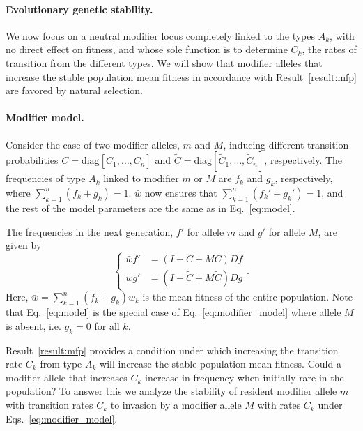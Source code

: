 \documentclass[9pt, a4paper, twocolumn]{extarticle}
\newcommand{\matrx}[1]{{\left[ \stackrel{}{#1}\right]}}
\newcommand{\diag}[1]{\mbox{diag}\matrx{#1}}
\begin{document}
\paragraph*{Evolutionary genetic stability.}

We now focus on a neutral modifier locus completely linked to the types $A_k$, with no direct effect on fitness, and whose sole function is to determine $C_k$, the rates of transition from the different types.
We will show that modifier alleles that increase the stable population mean fitness in accordance with Result~\ref{result:mfp} are favored by natural selection.

\paragraph*{Modifier model.}
Consider the case of two modifier alleles, $m$ and $M$, inducing different transition probabilities $C=\diag{C_1, \ldots, C_n}$ and $\tilde{C}=\diag{\tilde{C}_1, \ldots, \tilde{C}_n}$, respectively.
The frequencies of type $A_k$ linked to modifier $m$ or $M$ are $f_k$ and $g_k$, respectively, where $\sum_{k=1}^{n}{(f_k + g_k)}=1$.
$\bar{w}$ now ensures that $\sum_{k=1}^{n}{(f_k' + g_k')}=1$, 
and the rest of the model parameters are the same as in Eq.~\ref{eq:model}.

The frequencies in the next generation, $f'$ for allele $m$ and $g'$ for allele $M$, are given by
\begin{equation}
\begin{cases}
\bar{w} f' &= (I-C+MC)D f \\
\bar{w} g' &= (I-\tilde{C}+M\tilde{C})D g
\end{cases}.
\label{eq:modifier_model}
\end{equation}
Here, $\bar{w}=\sum_{k=1}^{n}{(f_k + g_k) w_k}$ is the mean fitness of the entire population. 
Note that Eq.~\ref{eq:model} is the special case of Eq.~\ref{eq:modifier_model} where allele $M$ is absent, i.e. $g_k=0$ for all $k$.

Result~\ref{result:mfp} provides a condition under which increasing the transition rate $C_k$ from type $A_k$ will increase the stable population mean fitness.
Could a modifier allele that increases $C_k$ increase in frequency when initially rare in the population?
To answer this we analyze the stability of resident modifier allele $m$ with transition rates $C_k$ to  invasion by a modifier allele $M$ with rates $\tilde{C}_k$ under Eqs.~\ref{eq:modifier_model}.
\end{document}

